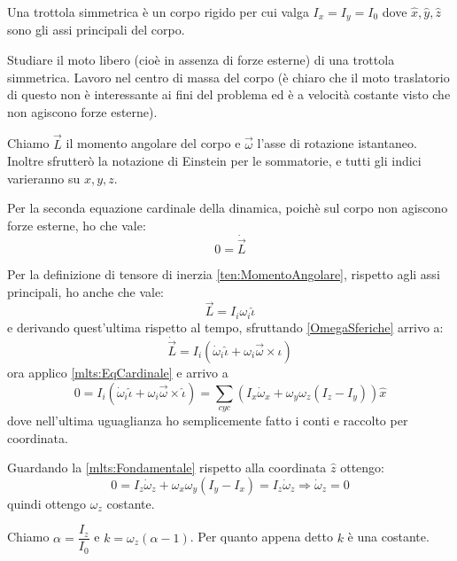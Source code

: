 \documentclass[../main.tex]{subfiles}
\begin{document}

\textex
Una trottola simmetrica è un corpo rigido per cui valga $I_x=I_y=I_0$ dove $\hat x, \hat y, \hat z$ sono gli assi principali del corpo.

Studiare il moto libero (cioè in assenza di forze esterne) di una trottola simmetrica.
\solution
Lavoro nel centro di massa del corpo (è chiaro che il moto traslatorio di questo non è interessante ai fini del problema ed è a velocità costante visto che non agiscono forze esterne).

Chiamo $\vec L$ il momento angolare del corpo e $\vec{\omega}$ l'asse di rotazione istantaneo. Inoltre sfrutterò la notazione di Einstein per le sommatorie, e tutti gli indici varieranno su $x,y,z$.

Per la seconda equazione cardinale della dinamica, poichè sul corpo non agiscono forze esterne, ho che vale:
\begin{equation}\label{mlts:EqCardinale}
	0=\dot{\vec L}
\end{equation}

Per la definizione di tensore di inerzia \cref{ten:MomentoAngolare}, rispetto agli assi principali, ho anche che vale:
\begin{equation}\label{mlts:MomentoComponenti}
	\vec L = I_i\omega_i \hat\iota
\end{equation}
e derivando quest'ultima rispetto al tempo, sfruttando \cref{OmegaSferiche} arrivo a:
\begin{equation*}
	\dot{\vec L}= I_i\left(\dot\omega_i\hat\iota + \omega_i\vec\omega\times \hat\iota\right)
\end{equation*}
ora applico \cref{mlts:EqCardinale} e arrivo a
\begin{equation}\label{mlts:Fondamentale}
	0=I_i\left(\dot\omega_i\hat\iota + \omega_i\vec\omega\times \hat\iota\right) =
	\sum_{cyc} \left( I_x\dot\omega_x+\omega_y\omega_z(I_z-I_y) \right)\hat x
\end{equation}
dove nell'ultima uguaglianza ho semplicemente fatto i conti e raccolto per coordinata.

Guardando la \cref{mlts:Fondamentale} rispetto alla coordinata $\hat z$ ottengo:
\begin{equation*} 
	0=I_z\dot\omega_z+\omega_x\omega_y(I_y-I_x)=I_z\dot\omega_z\Rightarrow \dot\omega_z=0
\end{equation*}
quindi ottengo $\omega_z$ costante.

Chiamo $\alpha=\dfrac{I_z}{I_0}$ e $k=\omega_z(\alpha-1)$. Per quanto appena detto $k$ è una costante.
\end{document}
